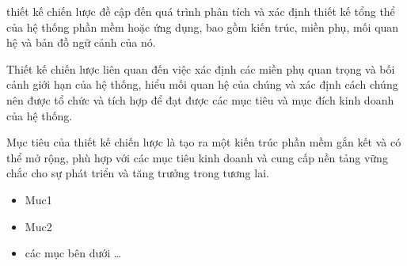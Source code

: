 thiết kế chiến lược đề cập đến quá trình phân tích và xác định thiết kế tổng thể của hệ thống phần mềm hoặc ứng dụng, bao gồm kiến trúc, miền phụ, mối quan hệ và bản đồ ngữ cảnh của nó.

Thiết kế chiến lược liên quan đến việc xác định các miền phụ quan trọng và bối cảnh giới hạn của hệ thống, hiểu mối quan hệ của chúng và xác định cách chúng nên được tổ chức và tích hợp để đạt được các mục tiêu và mục đích kinh doanh của hệ thống.

Mục tiêu của thiết kế chiến lược là tạo ra một kiến trúc phần mềm gắn kết và có thể mở rộng, phù hợp với các mục tiêu kinh doanh và cung cấp nền tảng vững chắc cho sự phát triển và tăng trưởng trong tương lai.

\begin{itemize}

\item Muc1

\item Muc2

\item các mục bên dưới \dots

\end{itemize}














% 

 